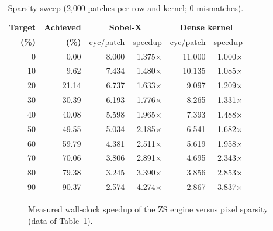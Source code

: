 \documentclass[11pt,journal,draftclsnofoot,onecolumn]{IEEEtran}
\begin{document}
\begin{table}[t]
\centering
\caption{Sparsity sweep (2{,}000 patches per row and kernel; 0 mismatches).}
\label{tab:sweep}
\small
\setlength{\tabcolsep}{8pt}
\begin{tabular}{rrrrrr}
\toprule
\textbf{Target} & \textbf{Achieved} & \multicolumn{2}{c}{\textbf{Sobel-X}} & \multicolumn{2}{c}{\textbf{Dense kernel}}\\
\textbf{(\%)} & \textbf{(\%)} & cyc/patch & speedup & cyc/patch & speedup\\
\midrule
 0 &  0.00 & 8.000 & 1.375$\times$ & 11.000 & 1.000$\times$\\
10 &  9.62 & 7.434 & 1.480$\times$ & 10.135 & 1.085$\times$\\
20 & 21.14 & 6.737 & 1.633$\times$ &  9.097 & 1.209$\times$\\
30 & 30.39 & 6.193 & 1.776$\times$ &  8.265 & 1.331$\times$\\
40 & 40.08 & 5.598 & 1.965$\times$ &  7.393 & 1.488$\times$\\
50 & 49.55 & 5.034 & 2.185$\times$ &  6.541 & 1.682$\times$\\
60 & 59.79 & 4.381 & 2.511$\times$ &  5.619 & 1.958$\times$\\
70 & 70.06 & 3.806 & 2.891$\times$ &  4.695 & 2.343$\times$\\
80 & 79.38 & 3.245 & 3.390$\times$ &  3.856 & 2.853$\times$\\
90 & 90.37 & 2.574 & 4.274$\times$ &  2.867 & 3.837$\times$\\
\bottomrule
\end{tabular}
\end{table}

\begin{figure}[t]
\centering
{}
\caption{Measured wall-clock speedup of the ZS engine versus pixel sparsity
(data of Table~\ref{tab:sweep}).}
\label{fig:sweep}
\end{figure}
\end{document}
